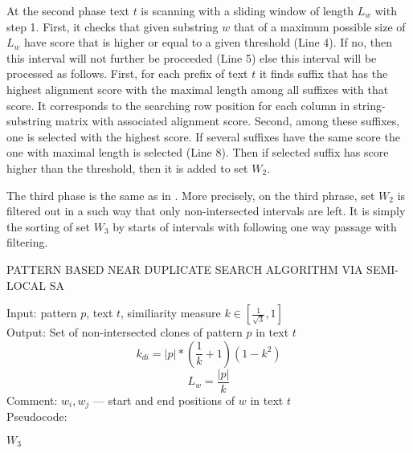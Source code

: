 At the second phase text $t$ is scanning with a sliding window of length $L_{w}$ with step 1.
First, it checks that given substring $w$ that of a maximum possible size of $L_{w}$ have score that is higher or equal to a given threshold (Line 4).
If no, then this interval will not further be proceeded (Line 5) else this interval will be processed as follows.
First, for each prefix of text $t$ it finds suffix that has the highest alignment score with the maximal length among all suffixes with that score. 
It corresponds to the searching row position for each column in string-substring matrix with associated alignment score. 
Second, among these suffixes, one is selected with the highest score.
If several suffixes have the same score the one with maximal length is selected (Line 8).
Then if selected suffix has score higher than the threshold, then it is added to set $W_2$.

The third phase is the same as in \cite{luciv2019interactive}. 
More precisely, on the third phrase, set $W_{2}$ is filtered out in a such way that only non-intersected intervals are left.
It is simply the sorting of set $W_{3}$ by starts of intervals with following one way passage with filtering.  


\begin{algorithm}[H]
\caption{PATTERN BASED NEAR DUPLICATE
SEARCH ALGORITHM VIA SEMI-LOCAL SA}
\label{alg:patternMathing1}
Input: pattern $p$, text $t$, similiarity measure $k \in  [ \frac{1}{\sqrt{3}} ,1  ]$\\
Output: Set of non-intersected clones of pattern $p$ in text $t$
\begin{equation}
    k_{di}=|p|*(\frac{1}{k}+1)(1-k^2)
\end{equation}
\begin{equation}
 L_{w} = \frac{|p|} {k}
\end{equation}
Comment: $w_{i},w_{j}$ --- start and end positions of $w$ in text $t$ \\
Pseudocode:
\begin{algorithmic}[1]
   \ENDIF
   \ENDIF
\ENDFOR
{}
\ENDIF

\ENDFOR
\RETURN $W_3$

\end{algorithmic}
\end{algorithm}


